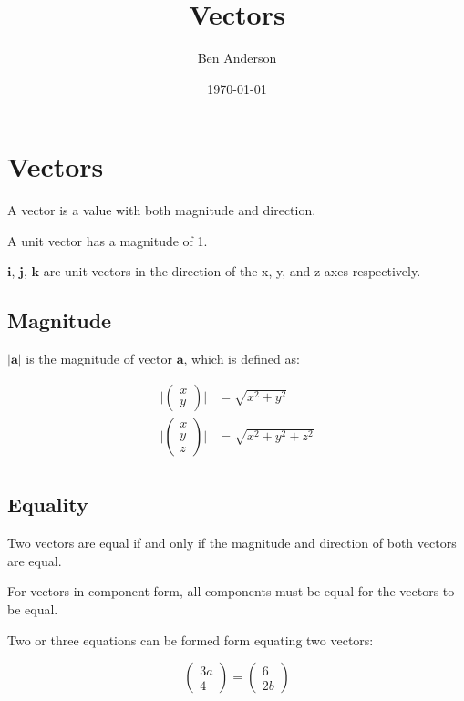 \documentclass[a4paper,11pt]{article}
\newcommand{\bb}{\boldsymbol}
\begin{document}
\title{Vectors}
\author{Ben Anderson}
\date{\today}
\maketitle
\pagebreak

\tableofcontents
\pagebreak




\section{Vectors}

A vector is a value with both magnitude and direction.

A unit vector has a magnitude of 1.

$\bb{i}$, $\bb{j}$, $\bb{k}$ are unit vectors in the direction of the x, y, and z axes respectively.


\subsection{Magnitude}

$|\bb{a}|$ is the magnitude of vector $\bb{a}$, which is defined as:

$$
\begin{aligned}
\lvert \begin{pmatrix} x \\ y \end{pmatrix} \rvert & = \sqrt{x^2 + y^2} \\
\lvert \begin{pmatrix} x \\ y \\ z \end{pmatrix} \rvert & = \sqrt{x^2 + y^2 + z^2} \\
\end{aligned}
$$


\subsection{Equality}

Two vectors are equal if and only if the magnitude and direction of both vectors
are equal.

For vectors in component form, all components must be equal for the vectors to
be equal.

Two or three equations can be formed form equating two vectors:

$$
\begin{pmatrix} 3a \\ 4 \end{pmatrix} = \begin{pmatrix} 6 \\ 2b \end{pmatrix}
$$
\end{document}
